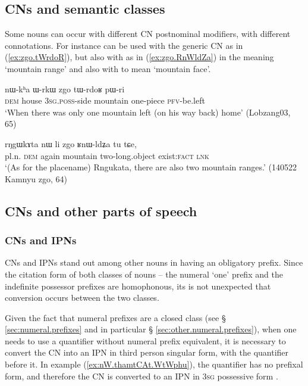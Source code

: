 \subsection{CNs and semantic classes} \label{sec:CN.classification}


Some nouns can occur with different CN postnominal modifiers, with different connotations. For instance  can be used with the generic CN  as in (\ref{ex:zgo.tWrdoR}), but also with    as in (\ref{ex:zgo.RnWldZa}) in the meaning `mountain range' and also with  to mean `mountain face'.

\begin{exe}
\ex \label{ex:zgo.tWrdoR}
\gll nɯ-kʰa ɯ-rkɯ zgo tɯ-rdoʁ pɯ-ri \\
\textsc{dem} house \textsc{3sg}.\textsc{poss}-side mountain one-piece \textsc{pfv}-be.left  \\
\glt `When there was only one mountain left (on his way back) home' (Lobzang03, 65)
\end{exe}

\begin{exe}
\ex \label{ex:zgo.RnWldZa}
\gll rŋgɯkɤta nɯ li zgo ʁnɯ-ldʑa tu tɕe, \\
pl.n. \textsc{dem} again mountain two-long.object exist:\textsc{fact} \textsc{lnk} \\
\glt `(As for the placename) Rngukata, there are also two mountain ranges.' (140522 Kamnyu zgo, 64)
\end{exe}


\subsection{CNs and other parts of speech} \label{sec:CN.parts.of.speech}
\subsubsection{CNs and IPNs}   \label{sec:CN.IPN}
CNs and IPNs stand out among other nouns in having an obligatory prefix. Since the citation form of both classes of nouns -- the numeral `one' prefix  and the indefinite possessor prefixes  are homophonous, its is not unexpected that conversion occurs between the two classes. 

Given the fact that numeral prefixes are a closed class (see § \ref{sec:numeral.prefixes} and in particular § \ref{sec:other.numeral.prefixes}), when one needs to use a quantifier without numeral prefix equivalent, it is necessary to convert the CN into an IPN in third person singular form, with the quantifier before it. In example (\ref{ex:nW.thamtCAt.WtWphu}), the quantifier  has no prefixal form, and therefore the CN  is converted to an IPN in \textsc{3sg} possessive form .

